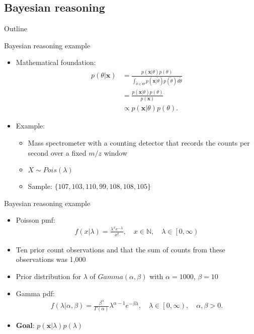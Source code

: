\documentclass[xcolor=dvipsnames]{beamer}
\begin{document}
\subsection{Bayesian reasoning}
\begin{frame}{Outline}
	\vspace{-10.5pt}
	\tableofcontents[currentsection,subsectionstyle=show/shaded/hide]
\end{frame}

\begin{frame}{Bayesian reasoning example}
\vspace{-15pt}
\begin{itemize}
	\item Mathematical foundation:
	\begin{align*}
	p(\theta|\textbf{x})&=\frac{p(\textbf{x}|\theta)p(\theta)}{\int_{\tilde{\theta} \in \Theta} p(\textbf{x}|\tilde{\theta})p(\tilde{\theta})d\tilde{\theta}}\\ &=\frac{p(\textbf{x}|\theta)p(\theta)}{p(\textbf{x})}\\
	&\propto p(\textbf{x}|\theta)p(\theta).
	\end{align*}
	\item Example:
	\begin{itemize}
		\item Mass spectrometer with a counting detector that records the counts per second over a fixed $m/z$ window
		\item $X\sim Pois(\lambda)$
		\item Sample: $\{107, 103, 110, 99, 108, 108, 105\}$
	\end{itemize}
\end{itemize}
\end{frame}

\begin{frame}{Bayesian reasoning example}
	\vspace{-15pt}
	\begin{itemize}
		\item Poisson pmf:
				\begin{gather*}
				f(x|\lambda)=\frac{\lambda^x e^{-\lambda}}{x!}, \quad x \in \mathbb{N}, \quad \lambda \in \left[0, \infty \right)
				\end{gather*}
		\item Ten prior count observations and that the sum of counts from these observations was 1,000
		\item Prior distribution for $\lambda$ of $Gamma(\alpha, \beta)$ with $\alpha=1000$, $\beta=10$
		\item Gamma pdf:
		\begin{gather*}
		f(\lambda|\alpha,\beta) =\frac{\beta^{\alpha}}{\Gamma(\alpha)}\lambda^{\alpha-1}e^{-\beta \lambda}, \quad \lambda \in \left[0, \infty \right), \quad \alpha,\beta >0.
		\end{gather*}
		\item \textbf{Goal}:  $p(\textbf{x}|\lambda)p(\lambda)$
	\end{itemize}
\end{frame}
\end{document}
